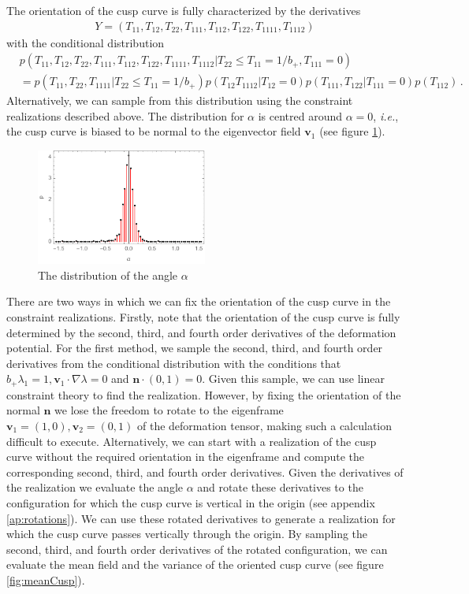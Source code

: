 \documentclass[a4paper, 11pt]{article}
\begin{document}
The orientation of the cusp curve is fully characterized by the derivatives  
\begin{align}
Y=(T_{11},T_{12},T_{22},T_{111},T_{112},T_{122},T_{1111},T_{1112})
\end{align}
with the conditional distribution
\begin{align}
&p(T_{11},T_{12},T_{22},T_{111},T_{112},T_{122},T_{1111},T_{1112}|T_{22} \leq T_{11}=1/b_+, T_{111}=0)\\
&=
p(T_{11},T_{22},T_{1111}|T_{22}\leq T_{11}=1/b_+)p(T_{12}T_{1112}|T_{12}=0)p(T_{111},T_{122}|T_{111}=0)p(T_{112})\,.
\end{align}
Alternatively, we can sample from this distribution using the constraint realizations described above. The distribution for $\alpha$ is centred around $\alpha=0$, \textit{i.e.}, the cusp curve is biased to be normal to the eigenvector field $\bm{v}_1$ (see figure \ref{fig:alpha}).

\begin{figure}
\centering
\includegraphics[width=0.5\textwidth]{alpha}
\caption{The distribution of the angle $\alpha$} 
\label{fig:alpha}
\end{figure}

There are two ways in which we can fix the orientation of the cusp curve in the constraint realizations. Firstly, note that the orientation of the cusp curve is fully determined by the second, third, and fourth order derivatives of the deformation potential. For the first method, we sample the second, third, and fourth order derivatives from the conditional distribution with the conditions that $b_+\lambda_1=1, \bm{v}_1 \cdot \nabla \lambda = 0$ and $\bm{n}\cdot (0,1) = 0$. Given this sample, we can use linear constraint theory to find the realization. However, by fixing the orientation of the normal $\bm{n}$ we lose the freedom to rotate to the eigenframe $\bm{v}_1=(1,0), \bm{v}_2=(0,1)$ of the deformation tensor, making such a calculation difficult to execute. Alternatively, we can start with a realization of the cusp curve without the required orientation in the eigenframe and compute the corresponding second, third, and fourth order derivatives. Given the derivatives of the realization we evaluate the angle $\alpha$ and rotate these derivatives to the configuration for which the cusp curve is vertical in the origin (see appendix \ref{ap:rotations}). We can use these rotated derivatives to generate a realization for which the cusp curve passes vertically through the origin. By sampling the second, third, and fourth order derivatives of the rotated configuration, we can evaluate the mean field and the variance of the oriented cusp curve (see figure \ref{fig:meanCusp}).
\end{document}
